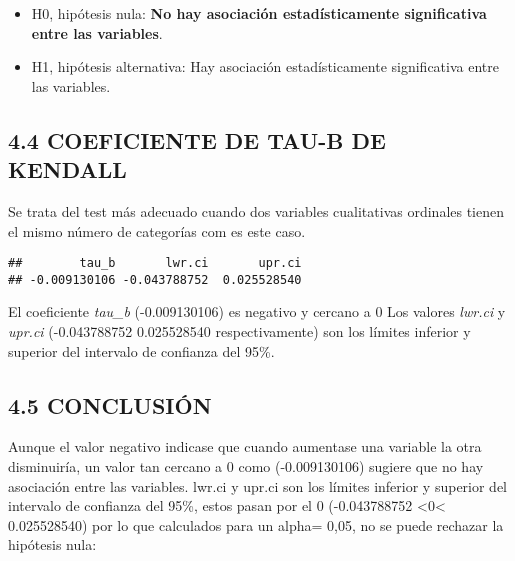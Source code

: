 \documentclass[
  12 pt,
  a4paper,
]{article}
\newenvironment{Shaded}{\begin{snugshade}}{\end{snugshade}}
\newcommand{\AttributeTok}[1]{\textcolor[rgb]{0.13,0.29,0.53}{#1}}
\newcommand{\FloatTok}[1]{\textcolor[rgb]{0.00,0.00,0.81}{#1}}
\newcommand{\FunctionTok}[1]{\textcolor[rgb]{0.13,0.29,0.53}{\textbf{#1}}}
\newcommand{\NormalTok}[1]{#1}
\newcommand{\OtherTok}[1]{\textcolor[rgb]{0.56,0.35,0.01}{#1}}
\newcommand{\SpecialCharTok}[1]{\textcolor[rgb]{0.81,0.36,0.00}{\textbf{#1}}}
\providecommand{\tightlist}{%
  \setlength{\itemsep}{0pt}\setlength{\parskip}{0pt}}
\begin{document}
\begin{itemize}
\tightlist
\item
  H0, hipótesis nula: \textbf{No hay asociación estadísticamente
  significativa entre las variables}.
\item
  H1, hipótesis alternativa: Hay asociación estadísticamente
  significativa entre las variables.
\end{itemize}

\subsection{4.4 COEFICIENTE DE TAU-B DE
KENDALL}\label{coeficiente-de-tau-b-de-kendall}

Se trata del test más adecuado cuando dos variables cualitativas
ordinales tienen el mismo número de categorías com es este caso.

\begin{Shaded}
\end{Shaded}

\begin{verbatim}
##        tau_b       lwr.ci       upr.ci 
## -0.009130106 -0.043788752  0.025528540
\end{verbatim}

El coeficiente \emph{tau\_b} (-0.009130106) es negativo y cercano a 0
Los valores \emph{lwr.ci} y \emph{upr.ci} (-0.043788752 0.025528540
respectivamente) son los límites inferior y superior del intervalo de
confianza del 95\%.

\subsection{4.5 CONCLUSIÓN}\label{conclusiuxf3n-2}

Aunque el valor negativo indicase que cuando aumentase una variable la
otra disminuiría, un valor tan cercano a 0 como (-0.009130106) sugiere
que no hay asociación entre las variables. lwr.ci y upr.ci son los
límites inferior y superior del intervalo de confianza del 95\%, estos
pasan por el 0 (-0.043788752 \textless0\textless{} 0.025528540) por lo
que calculados para un alpha= 0,05, no se puede rechazar la hipótesis
nula:
\end{document}
